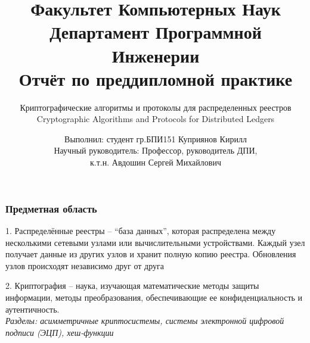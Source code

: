 \documentclass{beamer}
\title[Заголовок]{\footnotesize Факультет Компьютерных Наук\\Департамент
Программной Инженерии\\Отчёт по преддипломной практике}
\subtitle{Криптографические алгоритмы и протоколы для распределенных реестров\\
Cryptographic Algorithms and Protocols for Distributed Ledgers}
\author[Куприянов К.И.]{\scriptsize Выполнил: студент
гр.БПИ151 Куприянов Кирилл\\Научный руководитель: Профессор, руководитель ДПИ,\\к.т.н. Авдошин Сергей Михайлович}
\institute[Высшая школа экономики]{}
\date{\the\year}
\begin{document}
\frame[plain]{
    \maketitle
}



\begin{frame}
\frametitle{Предметная область}
    \begin{multicols}{2}
        1. Распределённые реестры -- ``база данных'', которая распределена между
        несколькими сетевыми узлами или вычислительными устройствами. Каждый
        узел получает данные из других узлов и хранит полную копию реестра.
        Обновления узлов происходят независимо друг от друга

        \columnbreak

        2. Криптография -- наука, изучающая математические методы защиты
        информации, методы преобразования, обеспечивающие ее конфиденциальность
        и аутентичность.\\
        \emph{Разделы: асимметричные криптосистемы, системы электронной цифровой
        подписи (ЭЦП), хеш-функции}
        \medskip
    \end{multicols}
\end{frame}
\end{document}
